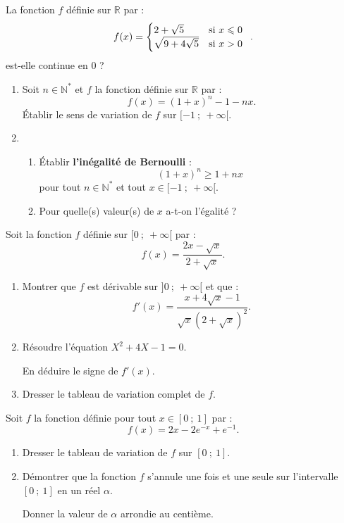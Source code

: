 \begin{question}[topic=fonction]
  La fonction $f$ définie sur $\mathbb{R}$ par :
  \[f(x)=\left\{\begin{array}{@{}ll}
        2+\sqrt{5} & \text{si~} x\leqslant0 \\
        \sqrt{9+4\sqrt{5}} & \text{si~} x>0 \\
  \end{array}\right..\]
  est-elle continue en 0 ?
\end{question}

\begin{question}[topic=fonction]
  \begin{enumerate}
    \item Soit $n\in\mathbb{N}^*$  et $f$ la fonction définie sur
      $\mathbb{R}$ par : \[f(x)=(1+x)^n-1-nx.\]
      Établir le sens de variation  de $f$ sur $[-1~;~+\infty[$.
    \item
      \begin{enumerate}
        \item Établir \textbf{l'inégalité de Bernoulli} :
          \[(1+x)^n\geqslant 1+nx\]
          pour tout $n\in\mathbb{N}^*$ et tout $x\in[-1~;~+\infty[$.
        \item Pour quelle(s) valeur(s) de $x$ a-t-on l'égalité ?
      \end{enumerate}
  \end{enumerate}
\end{question}

\begin{question}[topic=fonction]
  Soit la fonction $f$ définie sur $[0~;~+\infty[$ par :
  \[f(x)=\dfrac{2x-\sqrt{x}}{2+\sqrt{x}}.\]
  \begin{enumerate}
    \item Montrer que $f$ est dérivable sur $]0~;~+\infty[$ et que :
      \[f'(x)=\dfrac{x+4\sqrt{x}-1}{\sqrt{x}\left(2+\sqrt{x}\right)^2}.\]
    \item Résoudre l'équation $X^2+4X-1=0$.\par
      En déduire le signe de $f'(x)$.
    \item Dresser le tableau de variation complet de $f$.
  \end{enumerate}
\end{question}

\begin{question}[topic=exponetielle]
  Soit $f$ la fonction définie pour tout $x\in\left[0~;~1\right]$ par :
  \[f(x)=2x-2e^{-x}+e^{-1}.\]
  \begin{enumerate}
    \item Dresser le tableau de variation de $f$ sur $\left[0~;~1\right]$.
    \item Démontrer que la fonction $f$ s'annule une fois et une seule sur
      l'intervalle $\left[0~;~1\right]$ en un réel $\alpha$.\par
      Donner la valeur de $\alpha$ arrondie au centième.
  \end{enumerate}
\end{question}

